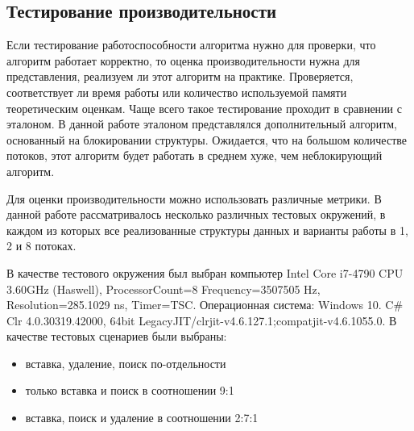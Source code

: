 \documentclass[12pt]{article}
\begin{document}
{				\subsection{Тестирование производительности}
					\par Если тестирование работоспособности алгоритма нужно для проверки, что алгоритм работает корректно, то оценка производительности нужна для представления, реализуем ли этот алгоритм на практике. Проверяется, соответствует ли время работы или количество используемой памяти теоретическим оценкам. Чаще всего такое тестирование проходит в сравнении с эталоном. В данной работе эталоном представлялся дополнительный алгоритм, основанный на блокировании структуры. Ожидается, что на большом количестве потоков, этот алгоритм будет работать в среднем хуже, чем неблокирующий алгоритм.
					\par Для оценки производительности можно использовать различные метрики. В данной работе рассматривалось несколько различных тестовых окружений, в каждом из которых все реализованные структуры данных и варианты работы в 1, 2 и 8 потоках. 
					\par В качестве тестового окружения был выбран компьютер Intel Core i7-4790 CPU 3.60GHz (Haswell), ProcessorCount=8 Frequency=3507505 Hz, Resolution=285.1029 ns, Timer=TSC. Операционная система: Windows 10. C\# Clr 4.0.30319.42000, 64bit LegacyJIT/clrjit-v4.6.127.1;compatjit-v4.6.1055.0.
					В качестве тестовых сценариев были выбраны: 
					\begin{itemize}
						\item вставка, удаление, поиск по-отдельности
						\item только вставка и поиск в соотношении 9:1
						\item вставка, поиск и удаление в соотношении 2:7:1			
					\end{itemize}
}
\end{document}
